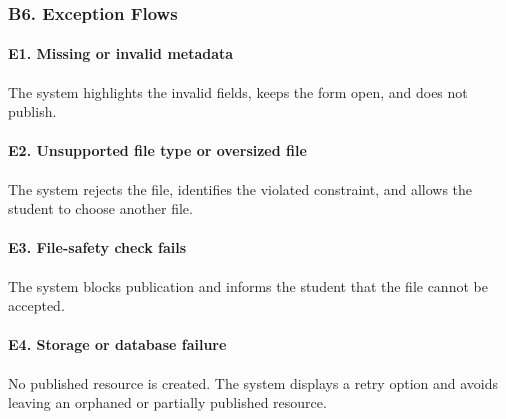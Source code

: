 \documentclass[12pt]{article}
\begin{document}
\hypertarget{sec:b6-exception-flows}{}
\subsubsection*{B6. Exception Flows}
\par\medskip

\hypertarget{sec:e1-missing-or-invalid-metadata}{}
\paragraph*{E1. Missing or invalid metadata}
\par\medskip

The system highlights the invalid fields, keeps the form open, and does not publish.
\par\medskip

\hypertarget{sec:e2-unsupported-file-type-or-oversized-file}{}
\paragraph*{E2. Unsupported file type or oversized file}
\par\medskip

The system rejects the file, identifies the violated constraint, and allows the student to choose another file.
\par\medskip

\hypertarget{sec:e3-file-safety-check-fails}{}
\paragraph*{E3. File-safety check fails}
\par\medskip

The system blocks publication and informs the student that the file cannot be accepted.
\par\medskip

\hypertarget{sec:e4-storage-or-database-failure}{}
\paragraph*{E4. Storage or database failure}
\par\medskip

No published resource is created. The system displays a retry option and avoids leaving an orphaned or partially published resource.
\par\medskip

\hypertarget{sec:e5-publication-permission-lost}{}
\end{document}
